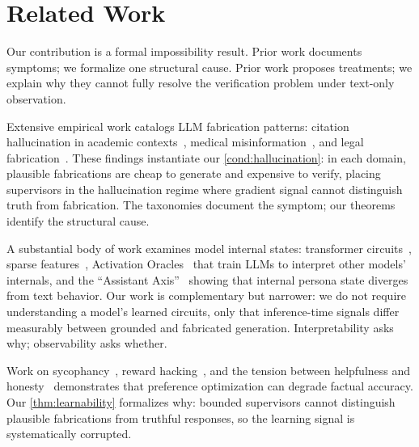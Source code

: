 \section{Related Work}\label{sec:related}

Our contribution is a formal impossibility result. Prior work documents
symptoms; we formalize one structural cause. Prior work proposes treatments; we
explain why they cannot fully resolve the verification problem under text-only
observation.

 Extensive empirical work catalogs LLM
fabrication patterns: citation hallucination in academic
contexts~\cite{alkaissi2023artificial}, medical
misinformation~\cite{thirunavukarasu2023large}, and legal
fabrication~\cite{dahl2024large}. These findings instantiate our
\autoref{cond:hallucination}: in each domain, plausible fabrications are
cheap to generate and expensive to verify, placing supervisors in the hallucination
regime where gradient signal cannot distinguish truth from fabrication. The
taxonomies document the symptom; our theorems identify the structural cause.

 A substantial body of work examines model internal
states: transformer circuits~\cite{elhage2021mathematical}, sparse
features~\cite{bricken2023monosemanticity}, Activation
Oracles~\cite{karvonen2025activation} that train LLMs to interpret other
models' internals, and the ``Assistant Axis''~\cite{lu2026assistantaxissituatingstabilizing} showing
that internal persona state diverges from text behavior. Our work is
complementary but narrower: we do not require understanding a model's learned
circuits, only that inference-time signals differ measurably between grounded
and fabricated generation. Interpretability asks why; observability asks
whether.

 Work on sycophancy~\cite{perez2022discovering},
reward hacking~\cite{gao2023scaling}, and the tension between helpfulness and
honesty~\cite{bai2022training} demonstrates that preference optimization can
degrade factual accuracy. Our \autoref{thm:learnability} formalizes why:
bounded supervisors cannot distinguish plausible fabrications from truthful
responses, so the learning signal is systematically corrupted.

